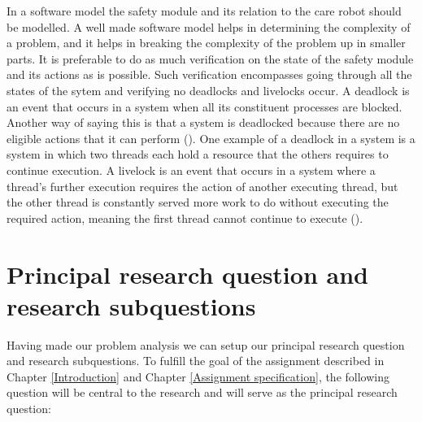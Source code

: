 \documentclass[12pt]{scrreprt}
\begin{document}
In a software model the safety module and its relation to the care robot should be modelled. A well made software model helps in determining the complexity of a problem, and it helps in breaking the complexity of the problem up in smaller parts. It is preferable to do as much verification on the state of the safety module and its actions as is possible. Such verification encompasses going through all the states of the sytem and verifying no deadlocks and livelocks occur.
A deadlock is an event that occurs in a system when all its constituent processes are blocked. Another way of saying this is that a system is deadlocked because there are no eligible actions that it can perform (\cite{ltsa}). One example of a deadlock in a system is a system in which two threads each hold a resource that the others requires to continue execution. A livelock is an event that occurs in a system where a thread's further execution requires the action of another executing thread, but the other thread is constantly served more work to do without executing the required action, meaning the first thread cannot continue to execute (\cite{livelock_starvation}).
\par
\par

\section{Principal research question and research subquestions}
\label{Principal research question and research subquestions}
Having made our problem analysis we can setup our principal research question and research subquestions. To fulfill the goal of the assignment described in Chapter \ref{Introduction} and Chapter \ref{Assignment specification}, the following question will be central to the research and will serve as the principal research question:

\begin{flushleft}
\textit{\mq}
\end{flushleft}
\end{document}
